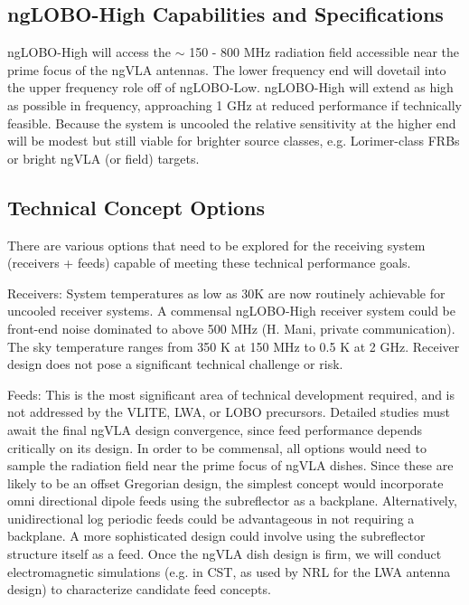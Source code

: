 \documentclass[11pt]{article}
\begin{document}
\subsection{ngLOBO-High Capabilities and Specifications}


ngLOBO-High will access the $\sim$ 150 - 800 MHz radiation field
accessible near the prime focus of the ngVLA antennas. The lower
frequency end will dovetail into the upper frequency role off of
ngLOBO-Low. ngLOBO-High will extend as high as possible in frequency,
approaching 1 GHz at reduced performance if technically feasible.  
Because the system is uncooled the relative sensitivity at
the higher end will be modest but still viable for brighter
source classes, e.g. Lorimer-class FRBs or bright ngVLA (or field)
targets.


\subsection{Technical Concept Options}

There are various options that need to be explored for the receiving system (receivers + feeds) capable of meeting these technical performance goals. 

Receivers: System temperatures as low as 30K are now routinely
achievable for uncooled receiver systems.  A commensal ngLOBO-High
receiver system could be front-end noise dominated to above 500 MHz
(H. Mani, private communication). The sky temperature ranges from 350
K at 150 MHz to 0.5 K at 2 GHz. Receiver design does not pose a
significant technical challenge or risk.

Feeds: This is the most significant area of technical development required, and is not addressed by the VLITE, LWA, or LOBO precursors. Detailed studies must await the final ngVLA design convergence, since feed performance depends critically on its design. In order to be commensal, all options would need to sample the radiation field near the prime focus of ngVLA dishes. Since these are likely to be an offset Gregorian design, the simplest concept would incorporate omni directional dipole feeds using the subreflector as a backplane. Alternatively, unidirectional log periodic feeds could be advantageous in not requiring a backplane. A more sophisticated design could involve using the subreflector structure itself as a feed.  Once the ngVLA dish design is firm, we will conduct electromagnetic simulations (e.g. in CST, as used by NRL for the LWA antenna design) to characterize candidate feed concepts.
\end{document}
